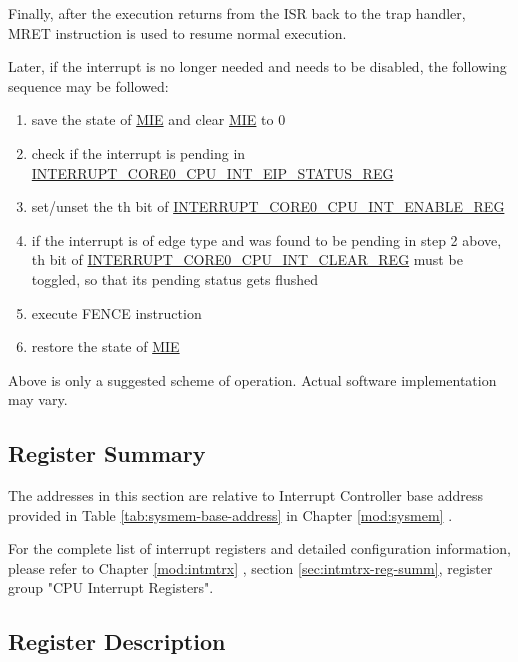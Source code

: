 \documentclass[main\_\_EN.tex]{subfiles}
\begin{document}
Finally, after the execution returns from the ISR back to the trap handler, MRET instruction is used to resume normal execution.

Later, if the  interrupt is no longer needed and needs to be disabled, the following sequence may be followed:
\begin{enumerate}
    \item save the state of \hyperref[fielddesc:MSTATUSMIE]{MIE} and clear \hyperref[fielddesc:MSTATUSMIE]{MIE} to 0
    \item check if the interrupt is pending in \hyperref[regdesc:INTERRUPTCORE0CPUINTEIPSTATUSREG]{INTERRUPT\_CORE0\_CPU\_INT\_EIP\_STATUS\_REG}
    \item set/unset the th bit of \hyperref[regdesc:INTERRUPTCORE0CPUINTENABLEREG]{INTERRUPT\_CORE0\_CPU\_INT\_ENABLE\_REG}
    \item if the interrupt is of edge type and was found to be pending in step 2 above, th bit of \hyperref[regdesc:INTERRUPTCORE0CPUINTCLEARREG]{INTERRUPT\_CORE0\_CPU\_INT\_CLEAR\_REG} must be toggled, so that its pending status gets flushed
    \item execute FENCE instruction
    \item restore the state of \hyperref[fielddesc:MSTATUSMIE]{MIE}
\end{enumerate}

Above is only a suggested scheme of operation. Actual software implementation may vary.


\hypertarget{riscvcpu-int-reg-summ}{}
\subsection{Register Summary}
\label{sec:riscvcpu-int-reg-summ}


The addresses in this section are relative to Interrupt Controller base address provided in Table \ref{tab:sysmem-base-address} in Chapter \ref{mod:sysmem} \textit{}.

For the complete list of interrupt registers and detailed configuration information, please refer to Chapter \ref{mod:intmtrx} \textit{}, section \ref{sec:intmtrx-reg-summ}, register group "CPU Interrupt Registers".



\subsection{Register Description}
\end{document}
